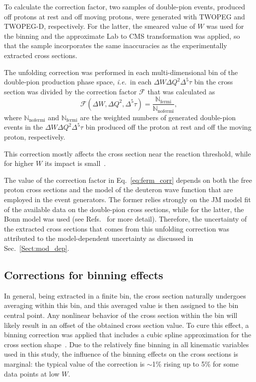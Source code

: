 \documentclass[prc,twocolumn,superscriptaddress,showpacs,amssymb,amsmath,amsfonts,aps,nofootinbib]{revtex4-1}
\begin{document}
To calculate the correction factor, two samples of double-pion events, produced off protons at rest and off moving protons, were generated with TWOPEG and TWOPEG-D, respectively. For the latter, the smeared value of $W$ was used for the binning and the approximate Lab to CMS transformation was applied, so that the sample incorporates the same inaccuracies as the experimentally extracted cross sections.


The unfolding correction was performed in each multi-dimensional bin of the double-pion production phase space, {\it i.e.}~in each $\Delta W \Delta Q^{2}\Delta^{5}\tau$ bin the cross section was divided by the correction factor $\mathcal{F}$ that was calculated as
\begin{equation}
\mathcal{F}(\Delta W, \Delta Q^{2},\Delta^{5}\tau) = \frac{\mathbb{N}_{\text{fermi}}}{\mathbb{N}_{\text{nofermi}}},
\label{eq:ferm_corr}
\end{equation}
where $\mathbb{N}_{\text{nofermi}}$ and $\mathbb{N}_{\text{fermi}}$ are the weighted numbers of generated double-pion events in the $\Delta W \Delta Q^{2}\Delta^{5}\tau$ bin produced off the proton at rest and off the moving proton, respectively. 

This correction mostly affects the cross section near the reaction threshold, while for higher $W$ its impact is small~\cite{my_an_note:2020, my_thesis:2021}.


The value of the correction factor in Eq.\!~\eqref{eq:ferm_corr} depends on both the free proton cross sections and the model of the deuteron wave function that are employed in the event generators. The former relies strongly on the JM model fit of the available data on the double-pion cross sections, while for the latter, the Bonn model was used (see Refs.\!~\cite{twopeg,twopeg-d} for more detail). Therefore, the uncertainty of the extracted cross sections that comes from this unfolding correction was attributed to the model-dependent uncertainty as discussed in Sec.\!~\ref{Sect:mod_dep}. 


\subsection{Corrections for binning effects}
\label{Sect:bin_cor}

In general, being extracted in a finite bin, the cross section naturally undergoes averaging within this bin, and this averaged value is then assigned to the bin central point. Any nonlinear behavior of the cross section within the bin will likely result in an offset of the obtained cross section value. To cure this effect, a binning correction was applied that includes a cubic spline approximation for the cross section shape~\cite{my_an_note:2020, my_thesis:2021}. Due to the relatively fine binning in all kinematic variables used in this study, the influence of the binning effects on the cross sections is marginal: the typical value of the correction is $\sim$1\% rising up to 5\% for some data points at low $W$.
\end{document}
